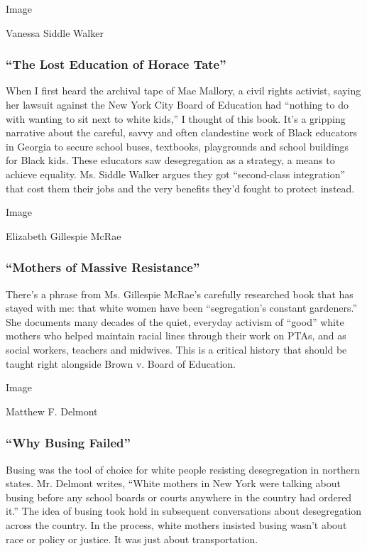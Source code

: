 Image

Vanessa Siddle Walker

\hypertarget{the-lost-education-of-horace-tate}{%
\subsubsection{``The Lost Education of Horace
Tate''}\label{the-lost-education-of-horace-tate}}

When I first heard the archival tape of Mae Mallory, a civil rights
activist, saying her lawsuit against the New York City Board of
Education had ``nothing to do with wanting to sit next to white kids,''
I thought of this book. It's a gripping narrative about the careful,
savvy and often clandestine work of Black educators in Georgia to secure
school buses, textbooks, playgrounds and school buildings for Black
kids. These educators saw desegregation as a strategy, a means to
achieve equality. Ms. Siddle Walker argues they got ``second-class
integration'' that cost them their jobs and the very benefits they'd
fought to protect instead.

Image

Elizabeth Gillespie McRae

\hypertarget{mothers-of-massive-resistance}{%
\subsubsection{``Mothers of Massive
Resistance''}\label{mothers-of-massive-resistance}}

There's a phrase from Ms. Gillespie McRae's carefully researched book
that has stayed with me: that white women have been ``segregation's
constant gardeners.'' She documents many decades of the quiet, everyday
activism of ``good'' white mothers who helped maintain racial lines
through their work on PTAs, and as social workers, teachers and
midwives. This is a critical history that should be taught right
alongside Brown v. Board of Education.

Image

Matthew F. Delmont

\hypertarget{why-busing-failed}{%
\subsubsection{``Why Busing Failed''}\label{why-busing-failed}}

Busing was the tool of choice for white people resisting desegregation
in northern states. Mr. Delmont writes, ``White mothers in New York were
talking about busing before any school boards or courts anywhere in the
country had ordered it.'' The idea of busing took hold in subsequent
conversations about desegregation across the country. In the process,
white mothers insisted busing wasn't about race or policy or justice. It
was just about transportation.

